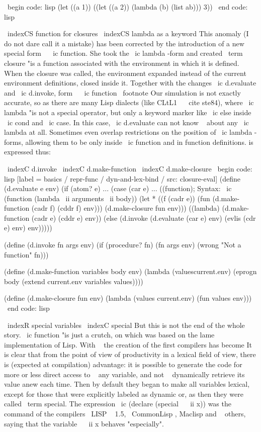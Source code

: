{{\ begin {code: lisp}
(let ((a 1))
  ((let ((a 2)) (lambda (b) (list ab)))
   3))
\ end {code: lisp}

\ indexCS {function} {for closures}
\ indexCS {lambda} {as a keyword}
This anomaly (I do not dare call it a mistake) has been corrected by the introduction of a new
special form ~ \ ic {function}. She took the \ ic {lambda} -form and created
\ term {closure} "is a function associated with the environment in which it is defined.
When the closure was called, the environment expanded instead of the current environment
definitions, closed inside it. Together with the changes \ ic {d.evaluate} and
\ ic {d.invoke}, form ~ \ ic {function} \ footnote {Our simulation is not exactly accurate, so
as there are many Lisp dialects (like CLtL1 ~ \ cite {ste84}), where
\ ic {lambda} "is not a special operator, but only a keyword marker
like \ ic {else} inside \ ic {cond} and \ ic {case}. In this case, \ ic {d.evaluate}
can not know ~ about any \ ic {lambda} at all. Sometimes even overlap
restrictions on the position of \ ic {lambda} -forms, allowing them to be only
inside \ ic {function} and in function definitions.} is expressed thus:

\ indexC {d.invoke} \ indexC {d.make-function} \ indexC {d.make-closure}
\ begin {code: lisp} [label = basics / repr-func / dyn-and-lex-bind / src: closure-eval]
(define (d.evaluate e env)
  (if (atom? e) ...
      (case (car e)
        ...
        ((function); Syntax: \ ic {(function (lambda \ ii {arguments} \ ii {body}))}
         (let * ((f (cadr e))
                (fun (d.make-function (cadr f) (cddr f) env)))
           (d.make-closure fun env)))
        ((lambda) (d.make-function (cadr e) (cddr e) env))
        (else (d.invoke (d.evaluate (car e) env)
                            (evlis (cdr e) env)
                            env)))))

(define (d.invoke fn args env)
  (if (procedure? fn)
      (fn args env)
      (wrong "Not a function" fn)))

(define (d.make-function variables body env)
  (lambda (values ​​current.env)
    (eprogn body (extend current.env variables values))))

(define (d.make-closure fun env)
  (lambda (values ​​current.env)
    (fun values ​​env)))
\ end {code: lisp}

\ indexR {special variables}
\ indexC {special}
But this is not the end of the whole story. \ ic {function} "is just a crutch, on
which was based on the lame implementation of Lisp. With ~ the creation of the first compilers has become
It is clear that from the point of view of productivity in a lexical field of view, there is
(expected at compilation) advantage: it is possible to generate the code for more or less
direct access to ~ any variable, and not ~ dynamically retrieve its value
anew each time. Then by default they began to make all variables lexical,
except for those that were explicitly labeled as dynamic or, as then
they were called \ term {special}. The expression \ ic {(declare (special ~ \ ii {x}))}
was the command of the compilers \ LISP ~ 1.5, \ CommonLisp , Maclisp and ~ others,
saying that the variable ~ \ ii {x} behaves "especially".

}}
